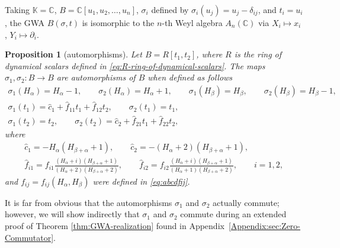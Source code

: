 \documentclass[10pt,a4paper]{amsart}
\numberwithin{equation}{section}
\newtheorem{Proposition}[Theorem]{Proposition}
 { \theoremstyle{definition}
\newtheorem{Definition}[Theorem]{Definition}
\newtheorem{Note}[Theorem]{Note}
\newtheorem{Example}[Theorem]{Example}
\newtheorem{Remark}[Theorem]{Remark} }
\begin{document}
\begin{Example}
	Taking $\mathbb{K}=\mathbb{C}$, $B=\mathbb{C}[u_1,u_2,\dots,u_n]$, $\sigma_i$ defined by $\sigma_i(u_j)=u_j-\delta_{ij}$, and $t_i=u_i$, the GWA $B(\sigma,t)$ is isomorphic to the $n$-th Weyl algebra $A_n(\mathbb{C})$ via $X_i\mapsto x_i$, $Y_i\mapsto \partial_i$.
\end{Example}

\begin{Proposition}[automorphisms]\label{Prop:Automorphisms}
	Let $B = R[t_{1},t_{2}]$, where $R$ is the ring of dynamical scalars defined in \eqref{eq:R-ring-of-dynamical-scalars}. The maps $\sigma_{1},\sigma_{2}\colon B \rightarrow B$ are automorphisms of $B$ when defined as follows
		\begin{gather*}
			\sigma_1(H_\alpha) =H_\alpha-1, \qquad \sigma_2(H_\alpha) =H_\alpha+1,\qquad
			\sigma_1(H_\beta) =H_\beta, \qquad \sigma_2(H_\beta) =H_\beta-1,\\
			\sigma_1(t_1) =\hat c_1+\hat f_{11}t_1+\hat f_{12}t_2,\qquad \sigma_2(t_1) =t_1,\\
			\sigma_1(t_2) =t_2, \qquad\sigma_2(t_2) =\hat c_2+\hat f_{21}t_1+\hat f_{22}t_2,
		\end{gather*}
	where
	\begin{gather*}
		\hat{c}_1 = -H_\alpha(H_{\beta+\alpha}+1),\qquad
		\hat{c}_2 = -(H_\alpha+2)(H_{\beta+\alpha}+1),\\
		\hat f_{i1} = f_{i1}\frac{(H_\alpha+i)(H_{\beta+\alpha}+1)}{(H_\alpha+2)(H_{\beta+\alpha}+2)},\qquad
		\hat f_{i2} = f_{i2}\frac{(H_\alpha+i)(H_{\beta+\alpha}+1)}{(H_\alpha+1)(H_{\beta+\alpha}+2)},\qquad i=1,2,
	\end{gather*}
	and $f_{ij}=f_{ij}(H_\alpha,H_\beta)$ were defined in \eqref{eq:abcdfij}.
	
\end{Proposition}

\begin{Remark}
	It is far from obvious that the automorphisms $\sigma_1$ and $\sigma_2$ actually commute; however, we will show indirectly that $\sigma_1$ and $\sigma_2$ commute during an extended proof of Theorem \ref{thm:GWA-realization} found in Appendix~\ref{Appendix:sec:Zero-Commutator}.
\end{Remark}
\end{document}
